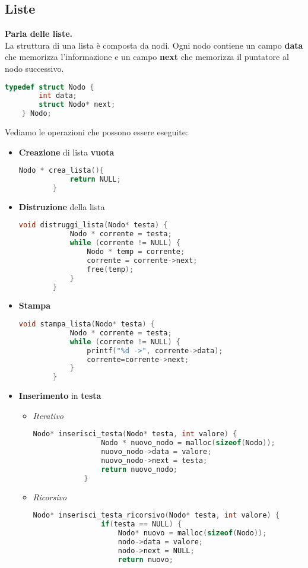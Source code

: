 \subsection{Liste}
\textbf{Parla delle liste.}\\
La struttura di una lista è composta da nodi. Ogni nodo contiene un campo \textbf{data} che memorizza l'informazione e un campo \textbf{next} che memorizza il puntatore al nodo successivo.
\begin{lstlisting}[language=C]
	typedef struct Nodo {
		int data;
		struct Nodo* next;
	} Nodo;
\end{lstlisting}
Vediamo le operazioni che possono essere eseguite:
\begin{itemize}
	\item \textbf{Creazione} di lista \textbf{vuota}
	\begin{lstlisting}[language=C]
		Nodo * crea_lista(){
			return NULL;
		}
	\end{lstlisting}
	\item \textbf{Distruzione} della lista
	\begin{lstlisting}[language=C]
		void distruggi_lista(Nodo* testa) {
			Nodo * corrente = testa;
			while (corrente != NULL) {
				Nodo * temp = corrente;
				corrente = corrente->next;
				free(temp);
			}
		}
	\end{lstlisting}
	\item \textbf{Stampa}
	\begin{lstlisting}[language=C]
		void stampa_lista(Nodo* testa) {
			Nodo * corrente = testa;
			while (corrente != NULL) {
				printf("%d ->", corrente->data);
				corrente=corrente->next;
			}
		}
	\end{lstlisting}
	\item \textbf{Inserimento} in \textbf{testa}
	\begin{itemize}
		\item \textit{Iterativo}
		\begin{lstlisting}[language=C]
			Nodo* inserisci_testa(Nodo* testa, int valore) {
				Nodo * nuovo_nodo = malloc(sizeof(Nodo));
				nuovo_nodo->data = valore;
				nuovo_nodo->next = testa;
				return nuovo_nodo;
			}
		\end{lstlisting}
		\item \textit{Ricorsivo}
		\begin{lstlisting}[language=C]
			Nodo* inserisci_testa_ricorsivo(Nodo* testa, int valore) {
				if(testa == NULL) {
					Nodo* nuovo = malloc(sizeof(Nodo));
					nodo->data = valore;
					nodo->next = NULL;
					return nuovo;

\end{lstlisting}
\end{itemize}
\end{itemize}
